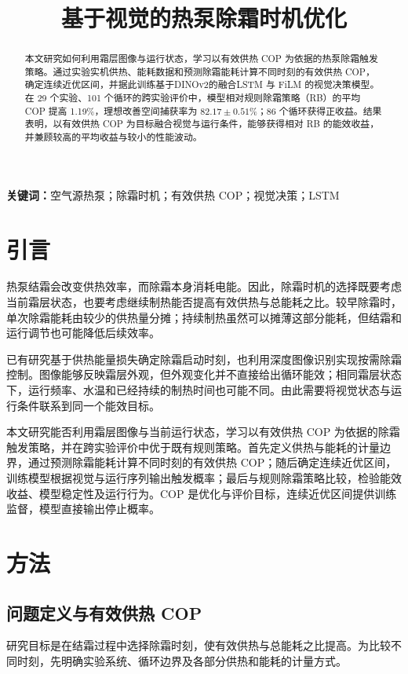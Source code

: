 \documentclass[UTF8,11pt,a4paper,fontset=fandol]{ctexart}
\title{基于视觉的热泵除霜时机优化}
\author{}
\date{}
\begin{document}
\maketitle
\begin{abstract}
本文研究如何利用霜层图像与运行状态，学习以有效供热 COP 为依据的热泵除霜触发策略。通过实验实机供热、能耗数据和预测除霜能耗计算不同时刻的有效供热 COP，确定连续近优区间，并据此训练基于DINOv2的融合LSTM 与 FiLM 的视觉决策模型。在 29 个实验、101 个循环的跨实验评价中，模型相对规则除霜策略（RB）的平均 COP 提高 1.19\%，理想改善空间捕获率为 $82.17\pm0.51$\%；86 个循环获得正收益。结果表明，以有效供热 COP 为目标融合视觉与运行条件，能够获得相对 RB 的能效收益，并兼顾较高的平均收益与较小的性能波动。
\end{abstract}
\noindent\textbf{关键词：}空气源热泵；除霜时机；有效供热 COP；视觉决策；LSTM

\section{引言}
\label{sec:overview}
热泵结霜会改变供热效率，而除霜本身消耗电能。因此，除霜时机的选择既要考虑当前霜层状态，也要考虑继续制热能否提高有效供热与总能耗之比。较早除霜时，单次除霜能耗由较少的供热量分摊；持续制热虽然可以摊薄这部分能耗，但结霜和运行调节也可能降低后续效率。

已有研究基于供热能量损失确定除霜启动时刻\cite{wang2020}，也利用深度图像识别实现按需除霜控制\cite{chen2022}。图像能够反映霜层外观，但外观变化并不直接给出循环能效；相同霜层状态下，运行频率、水温和已经持续的制热时间也可能不同。由此需要将视觉状态与运行条件联系到同一个能效目标。

本文研究能否利用霜层图像与当前运行状态，学习以有效供热 COP 为依据的除霜触发策略，并在跨实验评价中优于既有规则策略。首先定义供热与能耗的计量边界，通过预测除霜能耗计算不同时刻的有效供热 COP；随后确定连续近优区间，训练模型根据视觉与运行序列输出触发概率；最后与规则除霜策略比较，检验能效收益、模型稳定性及运行行为。COP 是优化与评价目标，连续近优区间提供训练监督，模型直接输出停止概率。

\section{方法}
\label{sec:methodology}
\subsection{问题定义与有效供热 COP}
\label{sec:problem}
研究目标是在结霜过程中选择除霜时刻，使有效供热与总能耗之比提高。为比较不同时刻，先明确实验系统、循环边界及各部分供热和能耗的计量方式。
\end{document}
